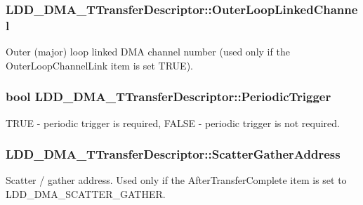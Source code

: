 \subsubsection[{Outer\+Loop\+Linked\+Channel}]{ L\+D\+D\+\_\+\+D\+M\+A\+\_\+\+T\+Transfer\+Descriptor\+::\+Outer\+Loop\+Linked\+Channel}\label{struct_l_d_d___d_m_a___t_transfer_descriptor_a14137cdb670d104436bfdad1bb88f078}
Outer (major) loop linked D\+M\+A channel number (used only if the Outer\+Loop\+Channel\+Link item is set T\+R\+U\+E). \hypertarget{struct_l_d_d___d_m_a___t_transfer_descriptor_aa29036eb34e794f3abbfea02be51711f}{}
\subsubsection[{Periodic\+Trigger}]{\setlength{\rightskip}{0pt plus 5cm}bool L\+D\+D\+\_\+\+D\+M\+A\+\_\+\+T\+Transfer\+Descriptor\+::\+Periodic\+Trigger}\label{struct_l_d_d___d_m_a___t_transfer_descriptor_aa29036eb34e794f3abbfea02be51711f}
T\+R\+U\+E -\/ periodic trigger is required, F\+A\+L\+S\+E -\/ periodic trigger is not required. \hypertarget{struct_l_d_d___d_m_a___t_transfer_descriptor_a7f82141e759573990f90002be3f12509}{}
\subsubsection[{Scatter\+Gather\+Address}]{ L\+D\+D\+\_\+\+D\+M\+A\+\_\+\+T\+Transfer\+Descriptor\+::\+Scatter\+Gather\+Address}\label{struct_l_d_d___d_m_a___t_transfer_descriptor_a7f82141e759573990f90002be3f12509}
Scatter / gather address. Used only if the After\+Transfer\+Complete item is set to L\+D\+D\+\_\+\+D\+M\+A\+\_\+\+S\+C\+A\+T\+T\+E\+R\+\_\+\+G\+A\+T\+H\+E\+R. \hypertarget{struct_l_d_d___d_m_a___t_transfer_descriptor_a1f204488d1a8b0c542fb7523f604b5e3}{}
